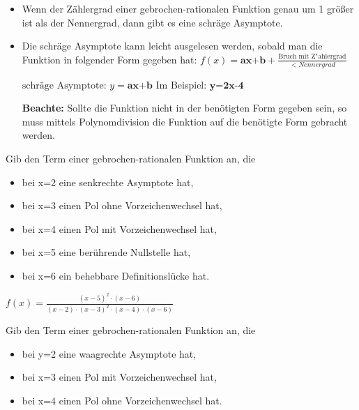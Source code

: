 \documentclass[paper=a6,landscape,ngerman,twoside=true,fontsize=12pt]{scrartcl}
\begin{document}
\begin{antwort}
	\begin{itemize} 
		\item \large Wenn der Zählergrad einer gebrochen-rationalen Funktion genau um 1 größer ist als der Nennergrad, dann gibt es eine schräge Asymptote.		
		
		\item Die schräge Asymptote kann leicht ausgelesen werden, sobald man die Funktion in folgender Form gegeben hat: $f(x)=\textbf{ax+b} +\frac{\text{Bruch mit  Z{"a}hlergrad}}{<Nennergrad}$ 
		
		$\text{schräge Asymptote: } y=\textbf{ax+b}$	Im Beispiel: $\textbf {y=2x-4}$
		
		\textbf{Beachte:} \large Sollte die Funktion nicht in der benötigten Form gegeben sein, so muss mittels Polynomdivision die Funktion auf die benötigte Form gebracht werden.
		
		
	\end{itemize} 
\end{antwort}
\begin{frage}
	\LARGE Gib den Term einer gebrochen-rationalen Funktion an, die
	\begin{itemize} \large
		\item bei x=2 eine senkrechte Asymptote hat,		
		\item bei x=3 einen Pol ohne Vorzeichenwechsel hat, 
		\item bei x=4 einen Pol mit Vorzeichenwechsel hat,
		\item bei x=5 eine berührende Nullstelle hat,	
		\item bei x=6 ein behebbare Definitionslücke hat.	
		
	\end{itemize} 
	
\end{frage}
\begin{antwort}
	\LARGE $f(x)=\frac{ (x-5)^2 \cdot (x-6)}{(x-2) \cdot (x-3)^2 \cdot (x-4) \cdot (x-6)}$
\end{antwort}
\begin{frage}
	\LARGE Gib den Term einer gebrochen-rationalen Funktion an, die
	\begin{itemize} \large
		\item bei y=2 eine waagrechte Asymptote hat,		
		\item bei x=3 einen Pol mit Vorzeichenwechsel hat, 
		\item bei x=4 einen Pol ohne Vorzeichenwechsel hat.	
		
	\end{itemize} 
	
\end{frage}
\end{document}
